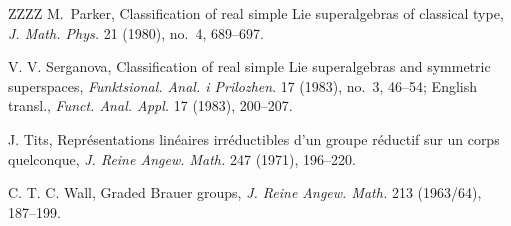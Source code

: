 \documentclass[12pt]{amsart}
\begin{document}
\begin{thebibliography}{ZZZZ}
M.~Parker,
Classification of real simple Lie superalgebras of classical type,
\emph{J. Math. Phys.} 21 (1980), no.~4, 689--697.



 V. V. Serganova,
Classification of real simple Lie superalgebras and symmetric superspaces,
\emph{Funktsional. Anal. i Prilozhen}. 17 (1983), no.~3, 46--54;
English transl., \emph{Funct. Anal. Appl.} 17 (1983), 200--207.



J. Tits,
Repr\'{e}sentations lin\'{e}aires irr\'{e}ductibles d'un groupe r\'{e}ductif sur un corps quelconque,
\emph{J. Reine Angew. Math.} 247 (1971), 196--220.


C. T. C. Wall, Graded Brauer groups,
\emph{J. Reine Angew. Math.} 213 (1963/64), 187--199.

\end{thebibliography}
\end{document}
